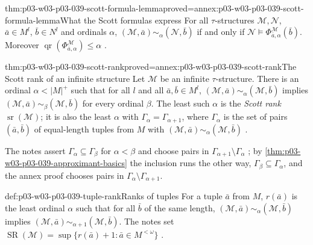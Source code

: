 \begin{hblemma}{thm:p03-w03-p03-039-scott-formula-lemma}{proved=annex:p03-w03-p03-039-scott-formula-lemma}{What the Scott formulas express}
For all \(\tau\)-structures \(\mathcal M,\mathcal N\), \(\bar a\in M^l\),
\(\bar b\in N^l\) and ordinals \(\alpha\),
\((\mathcal M,\bar a)\sim_\alpha(\mathcal N,\bar b)\) if and only if
\(\mathcal N\models\Phi^{\mathcal M}_{\bar a,\alpha}(\bar b)\). Moreover
\(\operatorname{qr}(\Phi^{\mathcal M}_{\bar a,\alpha})\le\alpha\)
\cite[Lemma~2.15, p.~17]{Marker2014InfinitaryNotes}.
\end{hblemma}

\begin{hblemma}{thm:p03-w03-p03-039-scott-rank}{proved=annex:p03-w03-p03-039-scott-rank}{The Scott rank of an infinite structure}
Let \(\mathcal M\) be an infinite \(\tau\)-structure. There is an ordinal
\(\alpha<\lvert M\rvert^+\) such that for all \(l\) and all
\(\bar a,\bar b\in M^l\), \((\mathcal M,\bar a)\sim_\alpha(\mathcal M,\bar b)\)
implies \((\mathcal M,\bar a)\sim_\beta(\mathcal M,\bar b)\) for every ordinal
\(\beta\). The least such \(\alpha\) is the \emph{Scott rank}
\(\operatorname{sr}(\mathcal M)\); it is also the least \(\alpha\) with
\(\Gamma_\alpha=\Gamma_{\alpha+1}\), where \(\Gamma_\alpha\) is the set of
pairs \((\bar a,\bar b)\) of equal-length tuples from \(M\) with
\((\mathcal M,\bar a)\sim_\alpha(\mathcal M,\bar b)\)
\cite[Lemma~2.17, pp.~17--18]{Marker2014InfinitaryNotes}.
\end{hblemma}

The notes assert \(\Gamma_\alpha\subseteq\Gamma_\beta\) for \(\alpha<\beta\)
and choose pairs in \(\Gamma_{\alpha+1}\setminus\Gamma_\alpha\)
\cite[p.~18]{Marker2014InfinitaryNotes}; by
\cref{thm:p03-w03-p03-039-approximant-basics} the inclusion runs the other
way, \(\Gamma_\beta\subseteq\Gamma_\alpha\), and the annex proof chooses
pairs in \(\Gamma_\alpha\setminus\Gamma_{\alpha+1}\).

\begin{hbdefinition}{def:p03-w03-p03-039-tuple-rank}{Ranks of tuples}
For a tuple \(\bar a\) from \(M\), \(r(\bar a)\) is the least ordinal
\(\alpha\) such that for all \(\bar b\) of the same length,
\((\mathcal M,\bar a)\sim_\alpha(\mathcal M,\bar b)\) implies
\((\mathcal M,\bar a)\sim_{\alpha+1}(\mathcal M,\bar b)\). The notes set
\(\operatorname{SR}(\mathcal M)=\sup\{r(\bar a)+1:\bar a\in M^{<\omega}\}\)
\cite[Def.~2.18, p.~18]{Marker2014InfinitaryNotes}.
\end{hbdefinition}


